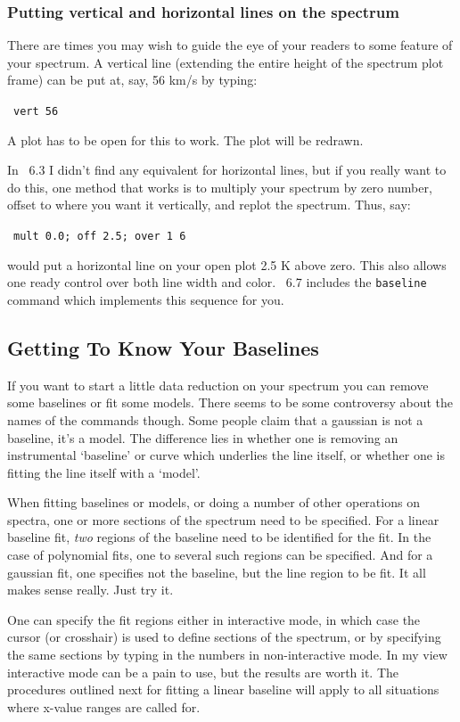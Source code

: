 \subsubsection{Putting vertical and horizontal lines on the spectrum}
\label{sec:specx_lines}
There are times you may wish to guide the eye of your readers to some
feature of your spectrum. A vertical line (extending the entire height
of the spectrum plot frame) can be put at, say, 56 km/s by typing:

\SP\ \verb|vert 56|

A plot has to be open for this to work. The plot will be redrawn.

In \SPECX\ 6.3 I didn't find any equivalent for horizontal
lines, but if you really want to do
this, one method that works is to multiply your spectrum by zero
number, offset to where you want it vertically, and replot the
spectrum. Thus, say:

\SP\ \verb|mult 0.0; off 2.5; over 1 6|

would put a horizontal line on your open plot 2.5 K above zero. This
also allows one ready control over both line width and color. \SPECX\
6.7 includes the {\tt baseline} command which implements this sequence
for you.

\subsection{Getting To Know Your Baselines}
\label{sec:specx_5.3}
If you want to start a little data reduction on your spectrum you can
remove some baselines or fit some models.  There seems to be some
controversy about the names of the commands though.  Some people claim
that a gaussian is not a baseline, it's a model. The difference lies
in whether one is removing an instrumental `baseline' or curve which
underlies the line itself, or whether one is fitting the line itself
with a `model'.

When fitting baselines or models, or doing a number of other
operations on spectra, one or more sections of the spectrum need to be
specified. For a linear baseline fit, {\em two} regions of the baseline need
to be identified for the fit. In the case of polynomial fits, one to
several such regions can be specified. And for a gaussian fit, one
specifies not the baseline, but the line region to be fit. It all
makes sense really. Just try it.

One can specify the fit regions either in interactive mode, in which
case the cursor (or crosshair) is used to define sections of the
spectrum, or by specifying the same sections by typing in the numbers
in non-interactive mode.  In my view interactive mode can be a pain to
use, but the results are worth it. The procedures outlined next for
fitting a linear baseline will apply to all situations where x-value
ranges are called for.

